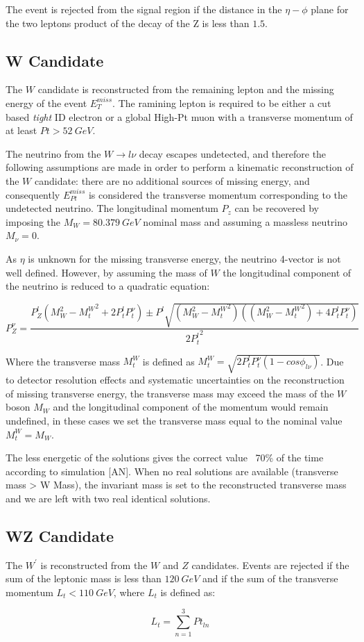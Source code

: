 The event is rejected from the signal region if the distance in the $\eta-\phi$
plane for the two leptons product of the decay of the Z is less than $1.5$.

\subsection{W Candidate}

The $W$ candidate is reconstructed from the remaining lepton and the missing energy
of the event $E_T^{miss}$. The ramining lepton is required to be either a cut based \emph{tight}
ID electron or a global High-Pt muon with a transverse momentum
of at least $Pt>52~GeV$.

The neutrino from the $W \rightarrow l\nu$ decay escapes undetected,
and therefore the following assumptions are made in order to perform a kinematic
reconstruction of the $W$ candidate: there are no additional sources of missing
energy, and consequently $E_{Pt}^{miss}$ is considered the transverse momentum
corresponding to the undetected neutrino. The longitudinal momentum $P_z$ can be
recovered by imposing the $M_W=80.379~GeV $ nominal mass and assuming
a massless neutrino $M_\nu = 0.$

As $\eta$ is unknown for the missing transverse energy, the neutrino 4-vector is
not well defined. However, by assuming the mass of $W$ the longitudinal component
of the neutrino is reduced to a quadratic equation:

\[
P_{Z}^{\nu} = \frac{P_{Z}^{l}({M_{W}^{2}-{M_{t}^{W}}^2+2P_{t}^{l}{P_{t}^{\nu}}}) \pm P^{l}\sqrt{(M_{W}^{2}-{M_{t}^{W}}^2)((M_{W}^{2}-{M_{t}^{W}}^2)+4P_{t}^{l}P_{t}^{\nu})}}{{2P_{t}^{l}}^{2}}
\]

Where the transverse mass $M_{t}^{W}$ is defined
as ${M_{t}^{W}}=\sqrt{2P_{t}^{l}P_{t}^{\nu}(1-cos\phi_{l\nu})}$.
Due to detector resolution effects and systematic uncertainties on the
reconstruction of missing transverse energy, the transverse mass may
exceed the mass of the $W$ boson $M_W$ and the
longitudinal component of the momentum would remain undefined, in these cases
we set the transverse mass equal to the nominal value $M_{t}^{W}=M_W$.

The less energetic of the solutions gives the correct value ~70\% of the time
according to simulation [AN].
When no real solutions are available (transverse mass > W Mass), the invariant
mass is set to the reconstructed transverse mass and we are left with two real
identical solutions.


\subsection{WZ Candidate}

The $W^{\prime}$ is reconstructed from the $W$ and $Z$ candidates.
Events are rejected if the sum of the leptonic mass is less than $120~GeV$ and
if the sum of the transverse momentum $L_{t}<110~GeV$, where $L_{t}$ is defined
as:

\[
L_{t} = \sum_{n=1}^{3} Pt_{ln}
\]






